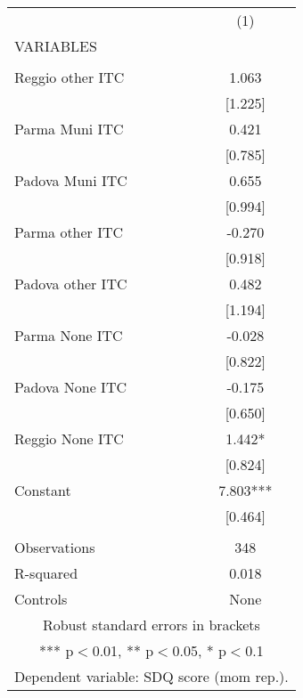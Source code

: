 \begin{tabular}{lc} \hline
 & (1) \\
VARIABLES &  \\ \hline
 &  \\
Reggio other ITC & 1.063 \\
 & [1.225] \\
Parma Muni ITC & 0.421 \\
 & [0.785] \\
Padova Muni ITC & 0.655 \\
 & [0.994] \\
Parma other ITC & -0.270 \\
 & [0.918] \\
Padova other ITC & 0.482 \\
 & [1.194] \\
Parma None ITC & -0.028 \\
 & [0.822] \\
Padova None ITC & -0.175 \\
 & [0.650] \\
Reggio None ITC & 1.442* \\
 & [0.824] \\
Constant & 7.803*** \\
 & [0.464] \\
 &  \\
Observations & 348 \\
R-squared & 0.018 \\
 Controls & None \\ \hline
\multicolumn{2}{c}{ Robust standard errors in brackets} \\
\multicolumn{2}{c}{ *** p$<$0.01, ** p$<$0.05, * p$<$0.1} \\
\multicolumn{2}{c}{ Dependent variable: SDQ score (mom rep.).} \\
\end{tabular}
